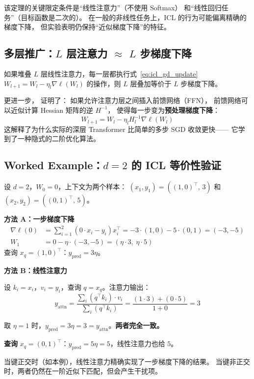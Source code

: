\begin{remark}
该定理的关键限定条件是``线性注意力''（不使用 Softmax）
和``线性回归任务''（目标函数是二次的）。
在一般的非线性任务上，ICL 的行为可能偏离精确的梯度下降，
但实验表明仍保持``近似梯度下降''的特征。
\end{remark}

\subsection*{多层推广：$L$ 层注意力 $\approx$ $L$ 步梯度下降}

如果堆叠 $L$ 层线性注意力，每一层都执行式~\eqref{eq:icl_gd_update}
$W_{l+1} = W_l - \eta_l \nabla \ell(W_l)$
的操作，则 $L$ 层叠加等价于 $L$ 步梯度下降。

更进一步，\citet{ahn2023transformers} 证明了：
如果允许注意力层之间插入前馈网络（FFN），
前馈网络可以近似计算 Hessian 矩阵的逆 $H^{-1}$，
使得每一步变为\textbf{预处理梯度下降}：
\begin{equation}
  W_{l+1} = W_l - \eta_l H_l^{-1} \nabla \ell(W_l)
\end{equation}
这解释了为什么实际的深层 Transformer
比简单的多步 SGD 收敛更快——
它学到了一种隐式的二阶优化算法。

\subsection*{Worked Example：$d=2$ 的 ICL 等价性验证}

\begin{example}[手算验证 ICL = 一步 GD]
设 $d = 2$，$W_0 = 0$，上下文为两个样本：
$(x_1, y_1) = ((1, 0)^\top,\, 3)$ 和
$(x_2, y_2) = ((0, 1)^\top,\, 5)$。

\textbf{方法 A：一步梯度下降}
\begin{align}
  \nabla \ell(0) &= \sum_{i=1}^{2} (0 \cdot x_i - y_i) x_i^\top
  = -3 \cdot (1, 0) - 5 \cdot (0, 1)
  = (-3, -5) \\
  W_1 &= 0 - \eta \cdot (-3, -5) = (\eta \cdot 3,\; \eta \cdot 5)
\end{align}
查询 $x_q = (1, 0)^\top$：$y_{\text{pred}} = 3\eta$。

\textbf{方法 B：线性注意力}

设 $k_i = x_i$，$v_i = y_i$，查询 $q = x_q$。注意力输出：
\begin{equation}
  y_{\text{attn}} = \frac{\sum_{i} (q^\top k_i) \cdot v_i}{\sum_{i} (q^\top k_i)}
  = \frac{(1 \cdot 3) + (0 \cdot 5)}{1 + 0} = 3
\end{equation}

取 $\eta = 1$ 时，$y_{\text{pred}} = 3\eta = 3 = y_{\text{attn}}$。\textbf{两者完全一致。}

\textbf{查询} $x_q = (0, 1)^\top$：$y_{\text{pred}} = 5\eta = 5$，线性注意力也给 $5$。

当键正交时（如本例），线性注意力精确实现了一步梯度下降的结果。
当键非正交时，两者仍然在一阶近似下匹配，但会产生干扰项。
\end{example}

